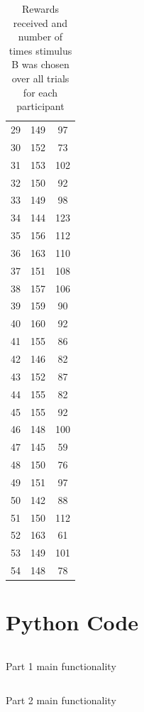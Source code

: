 \documentclass{article}
\begin{document}
\begin{appendices}
\begin{table}
\begin{tabular}{ccc}
      29 &  149 &   97 \\
      30 &  152 &   73 \\
      31 &  153 &  102 \\
      32 &  150 &   92 \\
      33 &  149 &   98 \\
      34 &  144 &  123 \\
      35 &  156 &  112 \\
      36 &  163 &  110 \\
      37 &  151 &  108 \\
      38 &  157 &  106 \\
      39 &  159 &   90 \\
      40 &  160 &   92 \\
      41 &  155 &   86 \\
      42 &  146 &   82 \\
      43 &  152 &   87 \\
      44 &  155 &   82 \\
      45 &  155 &   92 \\
      46 &  148 &  100 \\
      47 &  145 &   59 \\
      48 &  150 &   76 \\
      49 &  151 &   97 \\
      50 &  142 &   88 \\
      51 &  150 &  112 \\
      52 &  163 &   61 \\
      53 &  149 &  101 \\
      54 &  148 &   78 \\
      \bottomrule
    \end{tabular}
    \caption{Rewards received and number of times stimulus B was chosen over all trials for each participant}
    \label{table:participantcounts}
  \end{table}

\section{Python Code}

\begin{listing}
  \inputminted{python}{../part1helpers.py}
  \caption{Part 1 main functionality}
  \label{listing:part1functionality}
\end{listing}

\begin{listing}
  \inputminted{python}{../part2/part2helpers.py}
  \caption{Part 2 main functionality}
  \label{listing:part2functionality}
\end{listing}

\end{appendices}
\end{document}
